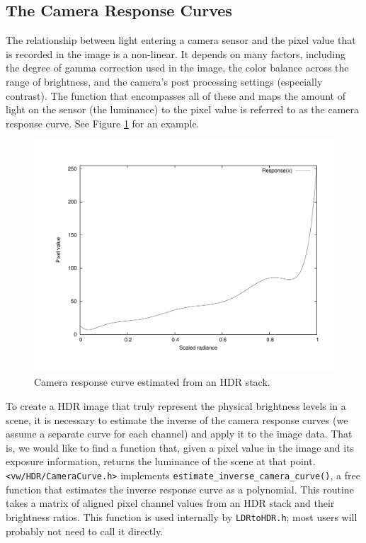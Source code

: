 \subsection{The Camera Response Curves}
The relationship between light entering a camera sensor and the pixel
value that is recorded in the image is a non-linear.  It depends on
many factors, including the degree of gamma correction used in the
image, the color balance across the range of brightness, and the
camera's post processing settings (especially contrast).  The function
that encompasses all of these and maps the amount of light on the
sensor (the luminance) to the pixel value is referred to as the camera
response curve.  See Figure \ref{fig:hdr_camera_curve} for an example.

\begin{figure}[tbp]
\begin{center}
  \includegraphics[width=5in]{images/hdr_response.pdf}
 \end{center}
  \caption{Camera response curve estimated from an HDR stack.}
  \label{fig:hdr_camera_curve}
\end{figure}

To create a HDR image that truly represent the physical brightness
levels in a scene, it is necessary to estimate the inverse of the
camera response curves (we assume a separate curve for each channel)
and apply it to the image data.  That is, we would like to find a
function that, given a pixel value in the image and its exposure
information, returns the luminance of the scene at that point.
\verb#<vw/HDR/CameraCurve.h># implements
\verb#estimate_inverse_camera_curve()#, a free function that estimates
the inverse response curve as a polynomial.  This routine takes a
matrix of aligned pixel channel values from an HDR stack and their
brightness ratios. This function is used internally by
\verb#LDRtoHDR.h#; most users will probably not need to call it
directly.

